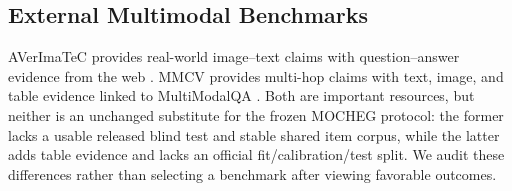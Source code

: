 \subsection{External Multimodal Benchmarks}

AVerImaTeC provides real-world image--text claims with question--answer evidence from the web \cite{cao2025averimatec}. MMCV provides multi-hop claims with text, image, and table evidence linked to MultiModalQA \cite{wang2025mmcv}. Both are important resources, but neither is an unchanged substitute for the frozen MOCHEG protocol: the former lacks a usable released blind test and stable shared item corpus, while the latter adds table evidence and lacks an official fit/calibration/test split. We audit these differences rather than selecting a benchmark after viewing favorable outcomes.
